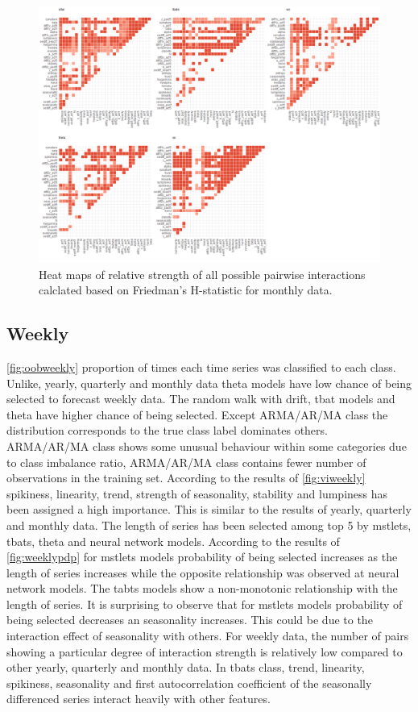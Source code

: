 \documentclass[11pt,a4paper,]{article}
\theoremstyle{definition}
\theoremstyle{definition}
\theoremstyle{definition}
\theoremstyle{remark}
\begin{document}
\begin{figure}
\centering
\includegraphics{figures/friedmanM2-1.png}
\caption{\label{fig:friedmanM2}Heat maps of relative strength of all
possible pairwise interactions calclated based on Friedman's H-statistic
for monthly data.}
\end{figure}

\subsection{Weekly}\label{weekly}

\autoref{fig:oobweekly} proportion of times each time series was
classified to each class. Unlike, yearly, quarterly and monthly data
theta models have low chance of being selected to forecast weekly data.
The random walk with drift, tbat models and theta have higher chance of
being selected. Except ARMA/AR/MA class the distribution corresponds to
the true class label dominates others. ARMA/AR/MA class shows some
unusual behaviour within some categories due to class imbalance ratio,
ARMA/AR/MA class contains fewer number of observations in the training
set. According to the results of \autoref{fig:viweekly} spikiness,
linearity, trend, strength of seasonality, stability and lumpiness has
been assigned a high importance. This is similar to the results of
yearly, quarterly and monthly data. The length of series has been
selected among top 5 by mstlets, tbats, theta and neural network models.
According to the results of \autoref{fig:weeklypdp} for mstlets models
probability of being selected increases as the length of series
increases while the opposite relationship was observed at neural network
models. The tabts models show a non-monotonic relationship with the
length of series. It is surprising to observe that for mstlets models
probability of being selected decreases an seasonality increases. This
could be due to the interaction effect of seasonality with others. For
weekly data, the number of pairs showing a particular degree of
interaction strength is relatively low compared to other yearly,
quarterly and monthly data. In tbats class, trend, linearity, spikiness,
seasonality and first autocorrelation coefficient of the seasonally
differenced series interact heavily with other features.
\end{document}

